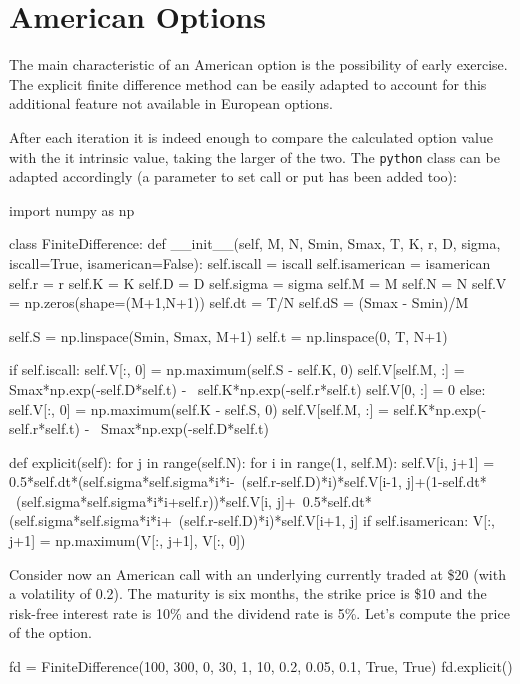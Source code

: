 \section{American Options}
The main characteristic of an American option is the possibility of early exercise. 
The explicit finite difference method can be easily adapted to account for this additional feature not available in European options.

After each iteration it is indeed enough to compare the calculated option value with the it intrinsic value, taking the larger of the two. The \texttt{python} class can be adapted accordingly (a parameter to set call or put has been added too):
\begin{ipython}
import numpy as np

class FiniteDifference:
    def __init__(self, M, N, Smin, Smax, T, K, r, D, sigma, 
                 iscall=True, isamerican=False):
        self.iscall = iscall
        self.isamerican = isamerican
        self.r = r
        self.K = K
        self.D = D
        self.sigma = sigma
        self.M = M
        self.N = N
        self.V = np.zeros(shape=(M+1,N+1))   
        self.dt = T/N
        self.dS = (Smax - Smin)/M

        self.S = np.linspace(Smin, Smax, M+1)
        self.t = np.linspace(0, T, N+1)

        if self.iscall:
            self.V[:, 0] = np.maximum(self.S - self.K, 0)
            self.V[self.M, :] = Smax*np.exp(-self.D*self.t) - \
                                self.K*np.exp(-self.r*self.t)
            self.V[0, :] = 0
        else:
            self.V[:, 0] = np.maximum(self.K - self.S, 0)
            self.V[self.M, :] = self.K*np.exp(-self.r*self.t) - \
                                Smax*np.exp(-self.D*self.t)

    def explicit(self):
        for j in range(self.N):
            for i in range(1, self.M):
                self.V[i, j+1] = 0.5*self.dt*(self.sigma*self.sigma*i*i-\
                                 (self.r-self.D)*i)*self.V[i-1, j]+(1-self.dt* \
                                 (self.sigma*self.sigma*i*i+self.r))*self.V[i, j]+\
                                 0.5*self.dt*(self.sigma*self.sigma*i*i+\
                                 (self.r-self.D)*i)*self.V[i+1, j]
            if self.isamerican:
                V[:, j+1] = np.maximum(V[:, j+1], V[:, 0])
\end{ipython}             

Consider now an American call with an underlying currently traded at \$20 (with a volatility of 0.2). The maturity is six months, the strike price is \$10 and the risk-free interest rate is 10\% and the dividend rate is 5\%. Let's compute the price of the option.
\begin{ipython}
fd = FiniteDifference(100, 300, 0, 30, 1, 10, 0.2, 0.05, 0.1, True, True)
fd.explicit()
\end{ipython}

